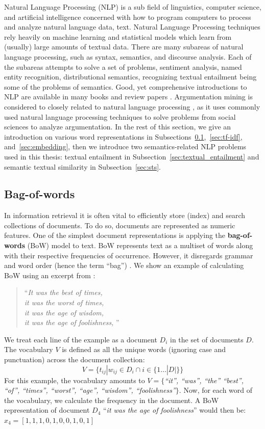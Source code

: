 Natural Language Processing (NLP) is a sub field of linguistics, computer
science, and artificial intelligence concerned with how to program computers to
process and analyze natural language data, text.  Natural Language Processing
techniques rely heavily on machine learning and statistical models which learn
from (usually) large amounts of textual data.  There are many subareas of
natural language processing, such as syntax, semantics, and discourse analysis.
Each of the subareas attempts to solve a set of problems, sentiment analysis, named
entity recognition, distributional semantics, recognizing textual entailment being
some of the problems of semantics. Good, yet comprehensive introductions to NLP are available 
in many books \citep{manning1999foundations} and review papers \citep{collobert2011natural}. 
Argumentation
mining is considered to closely related to natural language processing
\citep{lippi2015argument}, as it uses commonly used natural language processing
techniques to solve problems from social sciences to analyze argumentation.
In the rest of this section, we give an introduction on various word representations
in Subsections~\ref{sec:bow},~\ref{sec:tf-idf}, and~\ref{sec:embedding}, 
then we introduce two 
semantics-related NLP problems used in this thesis: 
textual entailment in Subsection~\ref{sec:textual_entailment}
and semantic textual similarity in Subsection~\ref{sec:sts}.

\subsection{Bag-of-words}
\label{sec:bow}
In information retrieval it is often 
vital to efficiently 
store (index) and search collections of documents. 
To do so, documents are represented as numeric features. 
One of the simplest document representations is applying the 
\textbf{bag-of-words} (BoW) model to text. BoW represents text as a multiset of
words along with their respective frequencies of occurrence. However, it disregards
grammar and word order (hence the term ``bag'')
\citep{harris1954distributional}. 
We show an example of calculating BoW
using an excerpt from \citep{dickens1949tale}:
\begin{quote}
``\emph{It was the best of times, \\
it was the worst of times, \\
it was the age of wisdom, \\
it was the age of foolishness,
}''
\end{quote}
We treat each line of the example as a document $D_i$ in the set of documents
$D$. The vocabulary $V$ is 
defined as all the unique words (ignoring case and punctuation)
across the document collection:
$$
V = \{t_{ij} | w_{ij} \in D_i \cap i \in \{1 \dots |D|\} \}
$$
For this example, the vocabulary amounts to
$V = \{$\emph{``it'', ``was'', ``the'' ``best'', ``of'', ``times'', ``worst'', ``age'',
``wisdom'', ``foolishness''}$\}$.
Now, for each word of the vocabulary, we calculate the frequency in the document. 
A BoW representation of document $D_4$ 
``\emph{it was the age of foolishness}''
would then be: $x_4 = [1, 1, 1, 0, 1, 0, 0, 1, 0, 1]$

